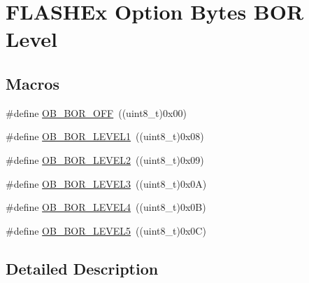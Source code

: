\hypertarget{group___f_l_a_s_h_ex___option___bytes___b_o_r___level}{\section{F\-L\-A\-S\-H\-Ex Option Bytes B\-O\-R Level}
\label{group___f_l_a_s_h_ex___option___bytes___b_o_r___level}
}
\subsection*{Macros}
\begin{DoxyCompactItemize}
\item 
\#define \hyperlink{group___f_l_a_s_h_ex___option___bytes___b_o_r___level_gaabc231cb1d05a94fe860f67bb5a37b12}{O\-B\-\_\-\-B\-O\-R\-\_\-\-O\-F\-F}~((uint8\-\_\-t)0x00)
\item 
\#define \hyperlink{group___f_l_a_s_h_ex___option___bytes___b_o_r___level_ga3a888b788e75f0bc1f9add85c9ccd9d6}{O\-B\-\_\-\-B\-O\-R\-\_\-\-L\-E\-V\-E\-L1}~((uint8\-\_\-t)0x08)
\item 
\#define \hyperlink{group___f_l_a_s_h_ex___option___bytes___b_o_r___level_gad678e849fcf817f6ed2d837538e8ebc2}{O\-B\-\_\-\-B\-O\-R\-\_\-\-L\-E\-V\-E\-L2}~((uint8\-\_\-t)0x09)
\item 
\#define \hyperlink{group___f_l_a_s_h_ex___option___bytes___b_o_r___level_ga3132b8202c0a345e9dd33d136714b046}{O\-B\-\_\-\-B\-O\-R\-\_\-\-L\-E\-V\-E\-L3}~((uint8\-\_\-t)0x0\-A)
\item 
\#define \hyperlink{group___f_l_a_s_h_ex___option___bytes___b_o_r___level_gaabff673365a8fc0c7e5b4d62f8b6f16c}{O\-B\-\_\-\-B\-O\-R\-\_\-\-L\-E\-V\-E\-L4}~((uint8\-\_\-t)0x0\-B)
\item 
\#define \hyperlink{group___f_l_a_s_h_ex___option___bytes___b_o_r___level_ga20a498ddcc36d0fe244f280227364c07}{O\-B\-\_\-\-B\-O\-R\-\_\-\-L\-E\-V\-E\-L5}~((uint8\-\_\-t)0x0\-C)
\end{DoxyCompactItemize}


\subsection{Detailed Description}


